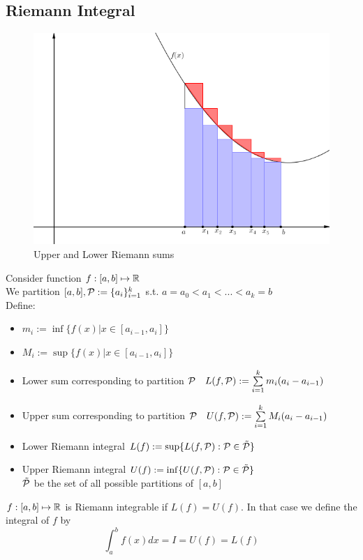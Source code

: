 \subsection*{Riemann Integral}
\begin{figure}[h]
    \centering
    \includegraphics[scale = 0.5]{integral.png}
    \caption{Upper and Lower Riemann sums}
    \label{fig:my_label}
\end{figure}
Consider function $f:[a,b] \mapsto \mathbb{R}$ \\
We partition $[a,b], \mathcal{P} := \{a_i\}_{i=1}^k$ s.t. $a = a_0 < a_1 < ... < a_k = b$ \\
Define:
\begin{itemize}
    \item $m_i := \inf\{f(x)| x\in [a_{i-1},a_i]\}$
    \item $M_i := \sup\{f(x)| x\in [a_{i-1},a_i]\}$
    \vspace{0.5cm}
    \item Lower sum corresponding to partition $\mathcal{P} \quad L(f,\mathcal{P}):= \sum\limits_{i=1}^k m_i (a_i - a_{i-1})$
    \item Upper sum corresponding to partition $\mathcal{P} \quad  U(f,\mathcal{P}):= \sum\limits_{i=1}^k M_i (a_i - a_{i-1})$
    \vspace{0.5cm}
    \item Lower Riemann integral $L(f):= \sup\{L(f,\mathcal{P}): \mathcal{P} \in \tilde{\mathcal{P}}\}$
    \item Upper Riemann integral $U(f):= \inf\{U(f,\mathcal{P}): \mathcal{P} \in \tilde{\mathcal{P}}\}$ \\
    $\tilde{\mathcal{P}}$ be the  set of all possible partitions of $[a,b]$
\end{itemize}
\begin{dfn}
$f:[a,b] \mapsto \mathbb{R}$ is Riemann integrable if $L(f) = U(f)$. In that case we define the integral of $f$ by
\begin{equation*}
    \int_a^b f(x) dx = I = U(f) = L(f)
\end{equation*}
\end{dfn}
\newpage
